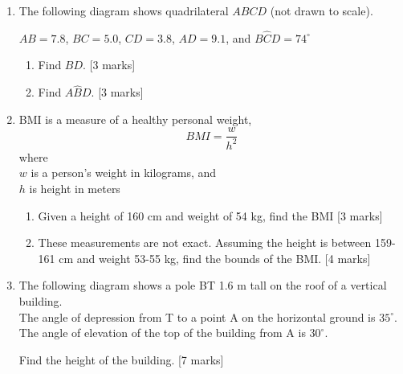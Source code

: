 \documentclass[12pt, twoside]{article}
\begin{document}
\begin{enumerate}
\item The following diagram shows quadrilateral $ABCD$ (not drawn to scale).
  \begin{center}
    \end{center} 
    $AB=7.8$, $BC=5.0$, $CD=3.8$, $AD=9.1$, and $B\hat{C}D=74^\circ$
    \begin{enumerate}
      \item Find $BD$. \hfill [3 marks]
      \item Find $A\hat{B}D$. \hfill [3 marks]
    \end{enumerate}

\newpage

\item BMI is a measure of a healthy personal weight, 
  \[\displaystyle BMI = \frac{w}{h^2}\]
    where \\
    $w$ is a person's weight in kilograms, and \\
    $h$ is height in meters
    \begin{enumerate} 
        \item Given a height of 160 cm and weight of 54 kg, find the BMI  \hfill [3 marks]
        \item These measurements are not exact. Assuming the height is between 159-161 cm and weight 53-55 kg, find the bounds of the BMI.  \hfill [4 marks]
      \end{enumerate}

\item The following diagram shows a pole BT 1.6 m tall on the roof of a vertical building. \\[0.25cm]
      The angle of depression from T to a point A on the horizontal ground is  
      $35^\circ$. \\[0.25cm]
      The angle of elevation of the top of the building from A is  
      $30^\circ$. 
        \begin{center}
          \end{center}
          Find the height of the building.  \hfill [7 marks]



\end{enumerate}
\end{document}
